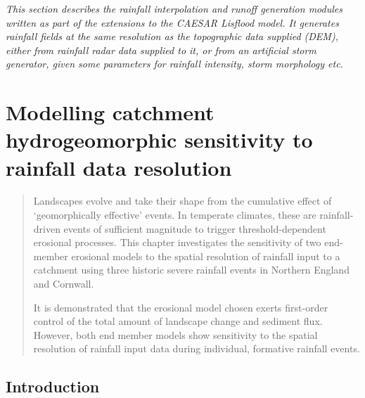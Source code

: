 \documentclass[12pt,oneside,PhD]{muthesis}
\begin{document}
\textit{This section describes the rainfall interpolation and runoff generation modules written as part of the extensions to the CAESAR Lisflood model. It generates rainfall fields at the same resolution as the topographic data supplied (DEM), either from rainfall radar data supplied to it, or from an artificial storm generator, given some parameters for rainfall intensity, storm morphology etc.
}
\chapter{Modelling catchment hydrogeomorphic sensitivity to rainfall data resolution}

\begin{abstract}
Landscapes evolve and take their shape from the cumulative effect of `geomorphically effective' events. In temperate climates, these are rainfall-driven events of sufficient magnitude to trigger threshold-dependent erosional processes. This chapter investigates the sensitivity of two end-member erosional models to the spatial resolution of rainfall input to a catchment using three historic severe rainfall events in Northern England and Cornwall.

It is demonstrated that the erosional model chosen exerts first-order control of the total amount of landscape change and sediment flux. However, both end member models show sensitivity to the spatial resolution of rainfall input data during individual, formative rainfall events. 

\end{abstract}
\section{Introduction}
\end{document}
